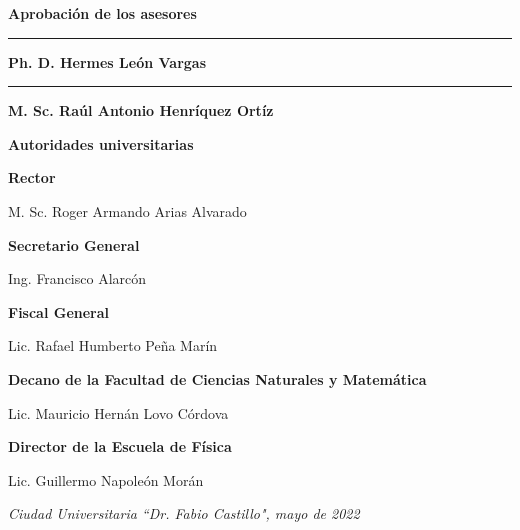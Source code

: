 
\newpage{\pagestyle{empty}\cleardoublepage}

\newpage %
\thispagestyle{empty}
\vspace{2cm}
\textbf{\LARGE Aprobaci\'on de los asesores}
\vfill
\begin{flushright}
	\begin{minipage}{10cm}
    \rule{8cm}{1pt}\par
    \textbf{Ph. D. Hermes Le\'on Vargas}
	\end{minipage}

	\begin{minipage}{10cm}
    \vspace{5cm}\par
    \rule{8cm}{1pt}\par
    \textbf{M. Sc. Ra\'ul Antonio Henr\'iquez Ort\'iz}
	\end{minipage}
\end{flushright}
\vfill

\newpage{\pagestyle{empty}\cleardoublepage}

\newpage %
\thispagestyle{empty}
\vspace{2cm}
\begin{center}
\textbf{\LARGE Autoridades universitarias}

\vspace{2cm}
\textbf{Rector}\par
M. Sc. Roger Armando Arias Alvarado

\vspace{2cm}
\textbf{Secretario General}\par
Ing. Francisco Alarc\'on

\vspace{2cm}
\textbf{Fiscal General}\par
Lic. Rafael Humberto Pe\~{n}a Mar\'in

\vspace{2cm}
\textbf{Decano de la Facultad de Ciencias Naturales y Matem\'atica}\par
Lic. Mauricio Hern\'an Lovo C\'ordova

\vspace{2cm}
\textbf{Director de la Escuela de F\'isica}\par
Lic. Guillermo Napole\'on Mor\'an
		
\vfill
	
\textit{Ciudad Universitaria ``Dr. Fabio Castillo", mayo de 2022}	
\end{center}

